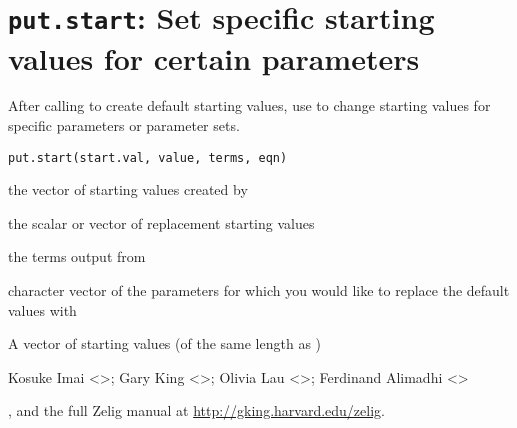  \section{{\tt put.start}: Set specific starting values for certain parameters}\label{ss:put.start}
\begin{Description}\relax
After calling  to create default starting values, use  
to change starting values for specific parameters or parameter sets.
\end{Description}
\begin{Usage}
\begin{verbatim}
put.start(start.val, value, terms, eqn)
\end{verbatim}
\end{Usage}
\begin{Arguments}
\begin{ldescription}
\item[\code{start.val}] the vector of starting values created by 
\item[\code{value}] the scalar or vector of replacement starting values
\item[\code{terms}] the terms output from 
\item[\code{eqn}] character vector of the parameters for which you would like to replace
the default values with 
\end{ldescription}
\end{Arguments}
\begin{Value}
A vector of starting values (of the same length as )
\end{Value}
\begin{Author}\relax
Kosuke Imai <>; Gary King
<>; Olivia Lau <>; Ferdinand Alimadhi
<>
\end{Author}
\begin{SeeAlso}\relax
{}, and the full Zelig manual at
\url{http://gking.harvard.edu/zelig}.
\end{SeeAlso}


